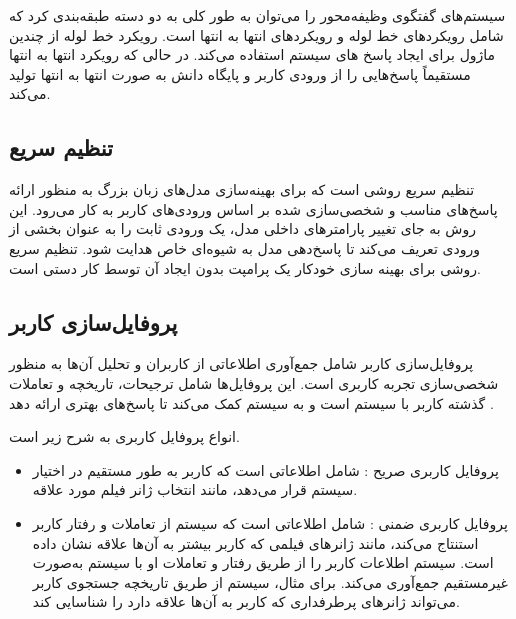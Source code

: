 سیستم‌های گفتگوی وظیفه‌محور را می‌توان به طور کلی به دو دسته طبقه‌بندی کرد که شامل رویکردهای 
خط لوله
 و رویکردهای 
انتها به انتها
 است. رویکرد خط لوله از چندین ماژول برای ایجاد پاسخ های سیستم استفاده می‌کند. در حالی که رویکرد انتها به انتها مستقیماً پاسخ‌هایی را از ورودی کاربر و 
پایگاه دانش
 به صورت انتها به انتها تولید می‌کند.%
\cite{chung2023instructtods}

\subsection{تنظیم سریع}
 تنظیم سریع%
 روشی است که برای بهینه‌سازی مدل‌های زبان بزرگ به منظور ارائه پاسخ‌های مناسب و شخصی‌سازی شده بر اساس ورودی‌های کاربر به کار می‌رود. این روش به جای تغییر پارامترهای داخلی مدل، یک ورودی%
 ثابت را به عنوان بخشی از ورودی تعریف می‌کند تا پاسخ‌دهی مدل به شیوه‌ای خاص هدایت شود. تنظیم سریع روشی برای بهینه سازی خودکار یک پرامپت بدون ایجاد آن توسط کار دستی است.%
\cite{kasahara2022building}


\subsection{پروفایل‌سازی کاربر}

پروفایل‌سازی کاربر%
 شامل جمع‌آوری اطلاعاتی از کاربران و تحلیل آن‌ها به منظور شخصی‌سازی تجربه کاربری است. این پروفایل‌ها شامل ترجیحات، تاریخچه و تعاملات گذشته کاربر با سیستم است و به سیستم کمک می‌کند تا پاسخ‌های بهتری ارائه دهد %
\cite{shanaz2020potential}
.

انواع پروفایل کاربری به شرح زیر است.
\begin{itemize}
\item
پروفایل کاربری صریح%
: شامل اطلاعاتی است که کاربر به طور مستقیم در اختیار سیستم قرار می‌دهد، مانند انتخاب ژانر فیلم مورد علاقه.
\item
پروفایل کاربری ضمنی%
: شامل اطلاعاتی است که سیستم از تعاملات و رفتار کاربر استنتاج می‌کند، مانند ژانرهای فیلمی که کاربر بیشتر به آن‌ها علاقه نشان داده است. سیستم اطلاعات کاربر را از طریق رفتار و تعاملات او با سیستم به‌صورت غیرمستقیم جمع‌آوری می‌کند. برای مثال، سیستم از طریق تاریخچه جستجوی کاربر می‌تواند ژانرهای پرطرفداری که کاربر به آن‌ها علاقه دارد را شناسایی کند.
\end{itemize}


